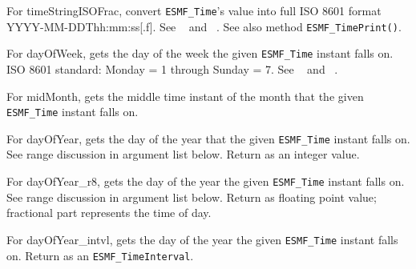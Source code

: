        For timeStringISOFrac, convert {\tt ESMF\_Time}'s value into full ISO 8601
       format YYYY-MM-DDThh:mm:ss[.f].  See ~\cite{ISO} and ~\cite{ISOnotes}.
       See also method {\tt ESMF\_TimePrint()}.
       
       For dayOfWeek, gets the day of the week the given {\tt ESMF\_Time}
       instant falls on.  ISO 8601 standard:  Monday = 1 through Sunday = 7.
       See ~\cite{ISO} and ~\cite{ISOnotes}.
  
       For midMonth, gets the middle time instant of the month that the given
       {\tt ESMF\_Time} instant falls on.
  
       For dayOfYear, gets the day of the year that the given {\tt ESMF\_Time}
       instant falls on.  See range discussion in argument list below.
       Return as an integer value.
  
       For dayOfYear\_r8, gets the day of the year the given {\tt ESMF\_Time}
       instant falls on.  See range discussion in argument list below.
       Return as floating point value; fractional part represents the time of
       day.
  
       \begin{sloppypar}
       For dayOfYear\_intvl, gets the day of the year the given {\tt ESMF\_Time}
       instant falls on.  Return as an {\tt ESMF\_TimeInterval}.
       \end{sloppypar}
  
